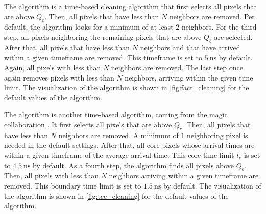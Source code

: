 The \fact{} algorithm \cite{temme_thesis, temme_diploma} is a time-based cleaning algorithm that first selects all pixels that are above
\(Q_c\). Then, all pixels that have less than \(N\) neighbors are removed. Per default, the algorithm
looks for a minimum of at least \(\num{2}\) neighbors. For the third step, all pixels neighboring
the remaining pixels that are above \(Q_b\) are selected. After that, all
pixels that have less than \(N\) neighbors and that have arrived within a given timeframe are removed.
This timeframe is set to \(\SI{5}{\nano\second}\) by default. Again, all pixels
with less than \(N\) neighbors are removed. The last step once again removes pixels with less than
\(N\) neighbors, arriving within the given time limit. The visualization of the algorithm is shown in
\autoref{fig:fact_cleaning} for the default values of the algorithm.

The \tcc{} algorithm is another time-based algorithm, coming from the \gls{magic} collaboration \cite{tcc}.
It first selects all pixels that are above \(Q_c\). Then, all pixels that have
less than \(N\) neighbors are removed. A minimum of \(\num{1}\) neighboring pixel is needed in the default
settings. After that, all core pixels whose arrival times are within a given timeframe of the average arrival time.
This core time limit \(t_c\) is set to \(\SI{4.5}{\nano\second}\) by default. As a fourth step,
the \tcc{} algorithm finds all pixels above \(Q_b\). Then, all pixels with
less than \(N\) neighbors arriving within a given timeframe are removed. This boundary time limit
is set to \(\SI{1.5}{\nano\second}\) by default. The visualization of the algorithm is shown in
\autoref{fig:tcc_cleaning} for the default values of the algorithm.

